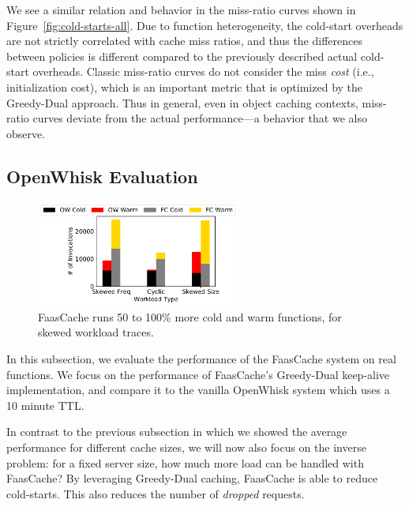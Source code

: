 

We see a similar relation and behavior in the miss-ratio curves shown in Figure~\ref{fig:cold-starts-all}. 
Due to function heterogeneity, the cold-start overheads are not strictly correlated with cache miss ratios, and thus the differences between policies is different compared to the previously described actual cold-start overheads. 
Classic miss-ratio curves do not consider the miss \emph{cost} (i.e., initialization cost), which is an important metric that is optimized by the Greedy-Dual approach.
Thus in general, even in object caching contexts, miss-ratio curves deviate from the actual performance---a behavior that we also observe. 

\subsection{OpenWhisk Evaluation}
\label{subsec:ow-eval}



\begin{figure}
  \centering
  \includegraphics[width=0.6\textwidth]{faascache/faas-keepalive-20/graphs/litmus_tests/litmus_2_stacked.pdf}
  \caption{FaasCache runs 50 to 100\% more cold and warm functions, for skewed workload traces.}
  \label{fig:litmus_2}  
\end{figure}


In this subsection, we evaluate the performance of the FaasCache system on real functions. 
We focus on the performance of FaasCache's Greedy-Dual keep-alive implementation, and compare it to the vanilla OpenWhisk system which uses a 10 minute TTL.


In contrast to the previous subsection in which we showed the average performance for different cache sizes, we will now also focus on the inverse problem: for a fixed server size, how much more load can be handled with FaasCache? 
By leveraging Greedy-Dual caching, FaasCache is able to reduce cold-starts. 
This also reduces the number of \emph{dropped} requests. %

